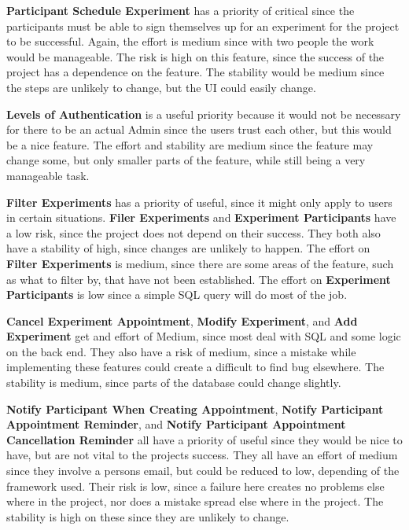 \textbf{Participant Schedule Experiment} has a priority of critical since the participants must be able to sign themselves up for an experiment for the project to be successful.  Again, the effort is medium since with two people the work would be manageable.  The risk is high on this feature, since the success of the project has a dependence on the feature.  The stability would be medium since the steps are unlikely to change, but the UI could easily change.

\textbf{Levels of Authentication} is a useful priority because it would not be necessary for there to be an actual Admin since the users trust each other, but this would be a nice feature.  The effort and stability are medium since the feature may change some, but only smaller parts of the feature, while still being a very manageable task.

\textbf{Filter Experiments} has a priority of useful, since it might only apply to users in certain situations.  \textbf{Filer Experiments} and \textbf{Experiment Participants} have a low risk, since the project does not depend on their success.  They both also have a stability of high, since changes are unlikely to happen.  The effort on \textbf{Filter Experiments} is medium, since there are some areas of the feature, such as what to filter by, that have not been established.  The  effort on \textbf{Experiment Participants} is low since a simple SQL query will do most of the job.

\textbf{Cancel Experiment Appointment}, \textbf{Modify Experiment}, and \textbf{Add Experiment} get and effort of Medium, since most deal with SQL and some logic on the back end.  They also have a risk of medium, since a mistake while implementing these features could create a difficult to find bug elsewhere.  The stability is medium, since parts of the database could change slightly.

\textbf{Notify Participant When Creating Appointment}, \textbf{Notify Participant Appointment Reminder}, and \textbf{Notify Participant Appointment Cancellation Reminder} all have a priority of useful since they would be nice to have, but are not vital to the projects success.  They all have an effort of medium since they involve a persons email, but could be reduced to low, depending of the framework used.  Their risk is low, since a failure here creates no problems else where in the project, nor does a mistake spread else where in the project.  The stability is high on these since they are unlikely to change.

